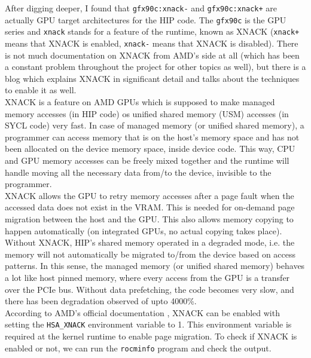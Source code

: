 \documentclass{btp}
\begin{document}
After digging deeper, I found that \texttt{gfx90c:xnack-} and \texttt{gfx90c:xnack+} are actually GPU target architectures for the HIP code. The \texttt{gfx90c} is the GPU series and \texttt{xnack} stands for a feature of the runtime, known as XNACK (\texttt{xnack+} means that XNACK is enabled, \texttt{xnack-} means that XNACK is disabled). There is not much documentation on XNACK from AMD's side at all (which has been a constant problem throughout the project for other topics as well), but there is a blog \cite{xnack} which explains XNACK in significant detail and talks about the techniques to enable it as well.
\\
\newline
XNACK is a feature on AMD GPUs which is supposed to make managed memory accesses (in HIP code) os unified shared memory (USM) accesses (in SYCL code) very fast. In case of managed memory (or unified shared memory), a programmer can access memory that is on the host's memory space and has not been allocated on the device memory space, inside device code. This way, CPU and GPU memory accesses can be freely mixed together and the runtime will handle moving all the necessary data from/to the device, invisible to the programmer.
\\
\newline
XNACK allows the GPU to retry memory accesses after a page fault when the accessed data does not exist in the VRAM. This is needed for on-demand page migration between the host and the GPU. This also allows memory copying to happen automatically (on integrated GPUs, no actual copying takes place).
\\
\newline
Without XNACK, HIP's shared memory operated in a degraded mode, i.e. the memory will not automatically be migrated to/from the device based on access patterns. In this sense, the managed memory (or unified shared memory) behaves a lot like host pinned memory, where every access from the GPU is a transfer over the PCIe bus. Without data prefetching, the code becomes very slow, and there has been degradation observed of upto 4000\%.
\\
\newline
According to AMD's official documentation \cite{amd-xnack}, XNACK can be enabled with setting the \texttt{HSA\_XNACK} environment variable to 1. This environment variable is required at the kernel runtime to enable page migration. To check if XNACK is enabled or not, we can run the \texttt{rocminfo} program and check the output.
\end{document}
